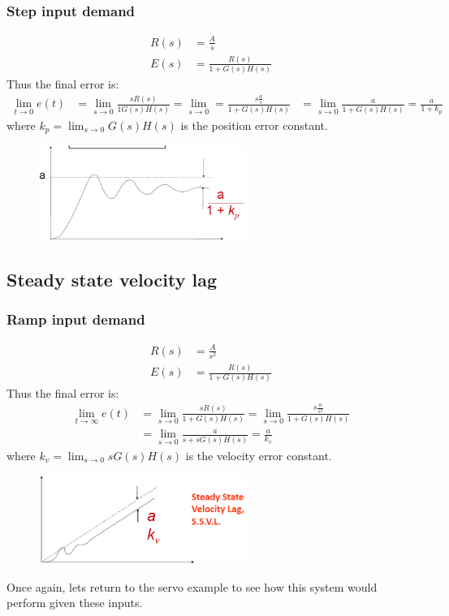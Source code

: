 \documentclass[class=report, crop=false, 12pt,a4paper]{standalone}
\begin{document}
\subsubsection{Step input demand}
\begin{align}
  R(s) &= \frac{A}{s}\\
  E(s) &= \frac{R(s)}{1 + G(s)H(s)}
\end{align}
Thus the final error is:
\begin{align}
  \lim_{t\rightarrow 0} e(t) &= \lim_{s\rightarrow 0} \frac{sR(s)}{1 G(s) H(s)} = \lim_{s\rightarrow 0} = \frac{s\frac{a}{s}}{1 + G(s)H(s)}
  &= \lim_{s\rightarrow 0} \frac{a}{1 +G(s)H(s)} = \frac{a}{1+k_p}
\end{align}
where $k_p = \lim_{s\rightarrow 0} G(s) H(s)$ is the position error constant.
\begin{figure}[H]
  \centerline{\includegraphics[width = 0.6\textwidth]{../img/diagram105.png}}
  \caption{}
\end{figure}
\subsection{Steady state velocity lag}
\subsubsection{Ramp input demand}
\begin{align}
  R(s) &= \frac{A}{s^2}\\
  E(s) &= \frac{R(s)}{1 + G(s)H(s)}
\end{align}
Thus the final error is:
\begin{align}
  \lim_{t\rightarrow \infty} e(t) &= \lim_{s\rightarrow 0} \frac{sR(s)}{1 + G(s)H(s)} = \lim_{s\rightarrow 0} \frac{s\frac{a}{s^2}}{1 + G(s)H(s)}\\
  &= \lim_{s\rightarrow 0} \frac{a}{s + sG(s) H(s)} = \frac{a}{k_v}
\end{align}
where $k_v = \lim_{s\rightarrow 0} sG(s) H(s)$ is the velocity error constant.
\begin{figure}[H]
  \centerline{\includegraphics[width = 0.6\textwidth]{../img/diagram106.png}}
  \caption{}
\end{figure}
Once again, lets return to the servo example to see how this system would perform given these inputs.
\end{document}

